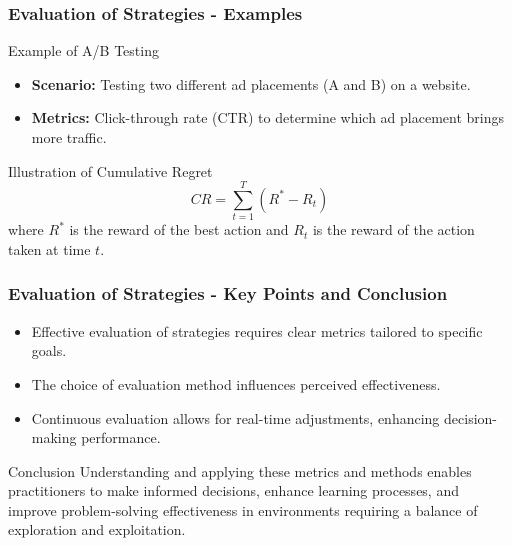 \documentclass[aspectratio=169]{beamer}
\begin{document}
\begin{frame}[fragile]
    \frametitle{Evaluation of Strategies - Examples}
    \begin{block}{Example of A/B Testing}
        \begin{itemize}
            \item \textbf{Scenario:} Testing two different ad placements (A and B) on a website.
            \item \textbf{Metrics:} Click-through rate (CTR) to determine which ad placement brings more traffic.
        \end{itemize}
    \end{block}
    
    \begin{block}{Illustration of Cumulative Regret}
        \begin{equation}
            CR = \sum_{t=1}^{T} (R^* - R_t)
        \end{equation}
        where \(R^*\) is the reward of the best action and \(R_t\) is the reward of the action taken at time \(t\).
    \end{block}
\end{frame}

\begin{frame}[fragile]
    \frametitle{Evaluation of Strategies - Key Points and Conclusion}
    \begin{itemize}
        \item Effective evaluation of strategies requires clear metrics tailored to specific goals.
        \item The choice of evaluation method influences perceived effectiveness.
        \item Continuous evaluation allows for real-time adjustments, enhancing decision-making performance.
    \end{itemize}
    
    \begin{block}{Conclusion}
        Understanding and applying these metrics and methods enables practitioners to make informed decisions, enhance learning processes, and improve problem-solving effectiveness in environments requiring a balance of exploration and exploitation.
    \end{block}
\end{frame}
\end{document}
